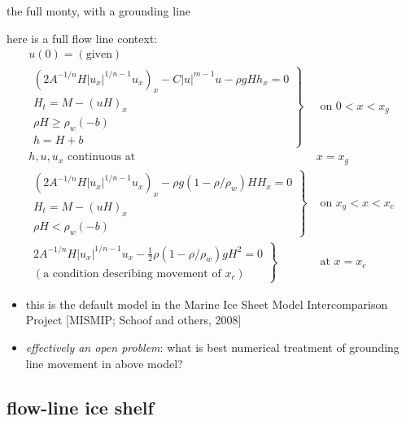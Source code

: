 \begin{frame}{the full monty, with a grounding line}
\label{slide:streamtoshelf}

\small
here is a full flow line context:
\begin{align*}
  u(0) = (\text{given}) \\
  \left.\begin{array}{r}
  \boxed{\left(2 A^{-1/n} H |u_x|^{1/n - 1} u_x\right)_x - C|u|^{m-1}u - \rho g H h_x = 0} \\
  H_t = M - (uH)_x \\
  \rho H \ge \rho_w (-b) \\
  h = H + b
  \end{array}\right\}& \text{ on } 0 < x < x_g \\
  h,u,u_x \text{ continuous at }& x=x_g \\
  \left.\begin{array}{r}
  \boxed{\left(2 A^{-1/n} H |u_x|^{1/n - 1} u_x\right)_x - \rho g (1-\rho/\rho_w) H H_x = 0} \\
  H_t = M - (uH)_x \\
  \rho H < \rho_w (-b)
  \end{array}\right\}& \text{ on } x_g < x < x_c \\
  \left.\begin{array}{r}
  2 A^{-1/n} H |u_x|^{1/n - 1} u_x - \frac{1}{2}\rho (1-\rho/\rho_w) g H^2 = 0 \\
  (\text{a condition describing movement of } x_c)
  \end{array}\right\}& \text{ at } x = x_c
\end{align*}
\small
\begin{itemize}
\item this is the default model in the Marine Ice Sheet Model Intercomparison Project [MISMIP; Schoof and others, 2008]
\item \emph{effectively an open problem}:  what is best numerical treatment of grounding line movement in above model?
\end{itemize}
\end{frame}


\subsection{flow-line ice shelf}

